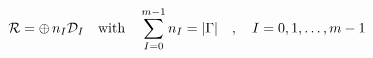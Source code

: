 \begin{equation}
\label{reirn}
{\cal R} = \oplus \, n_I {\cal D}_I \quad \mbox{with}  \quad
\sum_{I=0}^{m-1} n_I = |\Gamma| \quad , \quad I=0,1,\ldots,m-1
\end{equation}

